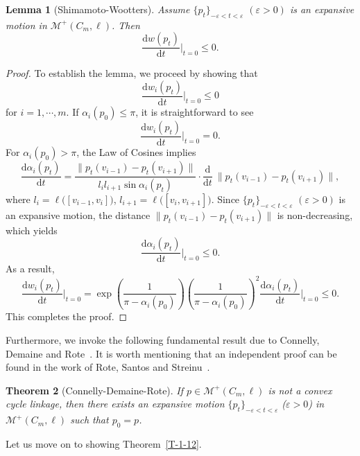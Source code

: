 \documentclass[11pt,letterpaper]{amsart}
\theoremstyle{plain}
\newtheorem{theorem}{Theorem}[section]
\newtheorem{lemma}[theorem]{Lemma}
\theoremstyle{definition}
\theoremstyle{remark}
\numberwithin{equation}{section}
\begin{document}
\begin{lemma}[Shimamoto-Wootters]\label{L-4-10}
Assume $\{p_t\}_{-\varepsilon<t<\varepsilon}$ $(\varepsilon>0)$ is an expansive motion in $\mathcal M^{+}(C_m,\ell)$. Then
\[
\frac{\mathrm{d}w(p_t)}{\mathrm{d}t}\bigg|_{t=0}\leq0.
\]
\end{lemma}

\begin{proof}
To establish the lemma, we proceed by showing that
\[
\frac{\mathrm{d}w_i(p_t)}{\mathrm{d}t}\bigg|_{t=0}\leq0
\]
for $i=1,\cdots,m$. If $\alpha_i(p_0)\leq \pi$, it is straightforward to see
\[
\frac{\mathrm{d}w_i(p_t)}{\mathrm{d}t}\bigg|_{t=0}=0.
\]
For $\alpha_i(p_0)>\pi$, the Law of Cosines implies
\[
\frac{\mathrm{d}\alpha_i(p_t)}{\mathrm{d}t}
=\frac{\|p_t(v_{i-1})-p_t(v_{i+1})\|}{l_il_{i+1}\sin \alpha_i(p_t)}\cdot\frac{\mathrm{d}}{\mathrm{d}t}~\|p_t(v_{i-1})-p_t(v_{i+1})\|,
\]
where $l_i=\ell\big([v_{i-1},v_{i}]\big)$, $l_{i+1}=\ell\big([v_{i},v_{i+1}]\big)$. Since $\{p_t\}_{-\varepsilon<t<\varepsilon}$ $(\varepsilon>0)$ is an expansive motion, the distance $\|p_t(v_{i-1})-p_t(v_{i+1})\|$ is non-decreasing, which yields
\[
\frac{\mathrm{d}\alpha_i(p_t)}{\mathrm{d}t}\bigg|_{t=0}\leq 0.
\]
As a result,
\[
\frac{\mathrm{d}w_i(p_t)}{\mathrm{d}t}\bigg|_{t=0}
=\exp\left(\frac{1}{\pi-\alpha_i(p_0)}\right)
\left(\frac{1}{\pi-\alpha_i(p_0)}\right)^2
\frac{\mathrm{d}\alpha_i(p_t)}{\mathrm{d}t}\bigg|_{t=0}\leq 0.
\]
This completes the proof.
\end{proof}


Furthermore, we invoke the following fundamental result due to Connelly, Demaine and Rote~\cite[Theorem 3]{Connelly-2003}. It is worth mentioning that an independent proof can be found in the work of Rote, Santos and Streinu~\cite[Theorem 4.3]{Rote-2003}.
\begin{theorem}[Connelly-Demaine-Rote]\label{T-4-11}
If $p\in \mathcal M^{+}(C_m,\ell)$ is not a convex cycle linkage, then there exists an expansive motion $\{p_t\}_{-\varepsilon<t<\varepsilon}$ ($\varepsilon>0$) in $\mathcal M^{+}(C_m,\ell)$ such that $p_0=p$.
\end{theorem}

Let us move on to showing Theorem~\ref{T-1-12}.
\end{document}

